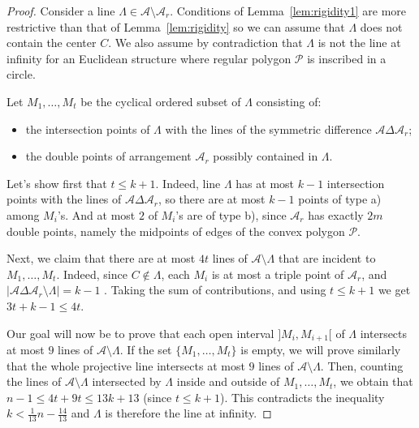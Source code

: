 \documentclass[a4paper,11pt,reqno]{amsart}
\theoremstyle{definition}
\theoremstyle{remark}
\theoremstyle{definition}
\theoremstyle{definition}
\theoremstyle{definition}
\numberwithin{equation}{section}
\begin{document}
\begin{proof}
Consider a line $\Lambda \in \mathcal{A} \setminus \mathcal{A}_{r}$. Conditions of Lemma~\ref{lem:rigidity1} are more restrictive than that of Lemma~\ref{lem:rigidity} so we can assume that $\Lambda$ does not contain the center $C$. We also assume by contradiction that $\Lambda$ is not the line at infinity for an Euclidean structure where regular polygon $\mathcal{P}$ is inscribed in a circle.
\par
Let $M_{1},\dots,M_{t}$ be the cyclical ordered subset of $\Lambda$ consisting of:
\begin{itemize}
    \item[a)] the intersection points of $\Lambda$ with the lines of the symmetric difference $\mathcal{A} \Delta \mathcal{A}_{r}$;
    \item[b)] the double points of arrangement $\mathcal{A}_{r}$ possibly contained in $\Lambda$.
\end{itemize}
Let's show first that $t \leq k+1$.  Indeed, line $\Lambda$ has at most $k-1$ intersection points with the lines of $\mathcal{A} \Delta \mathcal{A}_{r}$, so there are at most $k-1$ points of type a) among $M_i$'s. And at most $2$ of $M_i$'s are of type b), since  $\mathcal A_r$ has exactly $2m$ double points, namely the midpoints of edges of the convex polygon $\mathcal{P}$.

Next, we claim that there are at most $4t$ lines of ${\mathcal A}\setminus \Lambda$ that are incident to $M_1,\ldots, M_t$. Indeed, since $C\notin \Lambda$, each $M_i$ is at most a triple point of $\mathcal A_r$,  and $|\mathcal{A} \Delta \mathcal{A}_{r}\setminus \Lambda|=k-1$ . Taking the sum of contributions, and using   $t \leq k+1$ we get $3t+k-1\le 4t$.
 
\par
Our goal will now be to prove that each open interval $]M_{i},M_{i+1}[$ of $\Lambda$ intersects at most $9$ lines of $\mathcal{A}\setminus \Lambda$. If the set $\lbrace{ M_{1},\dots,M_{t} \rbrace}$ is empty, we will prove similarly that the whole projective line intersects at most $9$ lines of $\mathcal{A}\setminus \Lambda$. Then, counting the lines of $\mathcal{A}\setminus\Lambda$ intersected by $\Lambda$ inside and outside of $M_{1},\dots,M_{t}$, we obtain that $n-1 \leq 4t+9t \leq 13k+13$ (since $t \leq k+1$). This contradicts the inequality $k < \frac{1}{13}n - \frac{14}{13}$ and $\Lambda$ is therefore the line at infinity.\newline


\end{proof}
\end{document}
